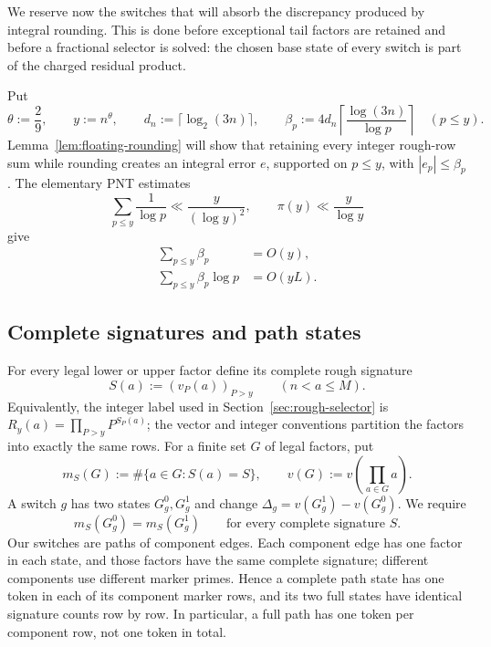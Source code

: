 \documentclass[11pt]{article}
\numberwithin{equation}{section}
\theoremstyle{definition}
\theoremstyle{remark}
\newcommand{\1}{\mathbf 1}
\begin{document}
We reserve now the switches that will absorb the discrepancy produced by
integral rounding.  This is done before exceptional tail factors are
retained and before a fractional selector is solved: the chosen base state
of every switch is part of the charged residual product.

Put
\begin{equation}
 \theta:=\frac29,\qquad y:=n^\theta,\qquad
 d_n:=\lceil\log_2(3n)\rceil,\qquad
 \beta_p:=4d_n\left\lceil\frac{\log(3n)}{\log p}\right\rceil
 \quad(p\le y).
 \label{eq:bank-discrepancy-box}
\end{equation}
Lemma~\ref{lem:floating-rounding} will show that retaining every integer
rough-row sum while rounding creates an integral error \(e\), supported on
\(p\le y\), with \(|e_p|\le\beta_p\).  The elementary PNT estimates
\[
 \sum_{p\le y}\frac1{\log p}\ll\frac{y}{(\log y)^2},
 \qquad \pi(y)\ll\frac{y}{\log y}
\]
give
\begin{align}
 \sum_{p\le y}\beta_p&=O(y),
 \label{eq:bank-number-of-paths}\\
 \sum_{p\le y}\beta_p\log p&=O(yL).
 \label{eq:bank-total-path-length}
\end{align}

\subsection{Complete signatures and path states}
\label{subsec:bank-signatures}

For every legal lower or upper factor define its complete rough signature
\begin{equation}
 S(a):=(v_P(a))_{P>y}\qquad(n<a\le M).
 \label{eq:complete-rough-signature}
\end{equation}
Equivalently, the integer label used in
Section~\ref{sec:rough-selector} is
\(R_y(a)=\prod_{P>y}P^{S_P(a)}\); the vector and integer conventions
partition the factors into exactly the same rows.
For a finite set \(G\) of legal factors, put
\[
 m_S(G):=\#\{a\in G:S(a)=S\},\qquad
 v(G):=v\!\left(\prod_{a\in G}a\right).
\]
A switch \(g\) has two states \(G_g^0,G_g^1\) and change
\(\Delta_g=v(G_g^1)-v(G_g^0)\).  We require
\begin{equation}
 m_S(G_g^0)=m_S(G_g^1)
 \qquad\text{for every complete signature }S.
 \label{eq:bank-all-factor-invariance}
\end{equation}
Our switches are paths of component edges.  Each component edge has one
factor in each state, and those factors have the same complete signature;
different components use different marker primes.  Hence a complete path
state has one token in each of its component marker rows, and its two full
states have identical signature counts row by row.  In particular, a full
path has one token per component row, not one token in total.
\end{document}
